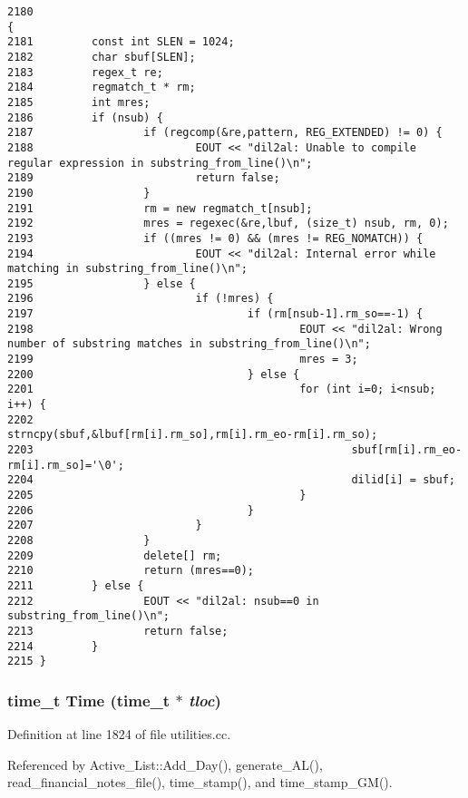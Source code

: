 \footnotesize\begin{verbatim}2180                                                                                             {
2181         const int SLEN = 1024;
2182         char sbuf[SLEN];
2183         regex_t re;
2184         regmatch_t * rm;
2185         int mres;
2186         if (nsub) {
2187                 if (regcomp(&re,pattern, REG_EXTENDED) != 0) {
2188                         EOUT << "dil2al: Unable to compile regular expression in substring_from_line()\n";
2189                         return false;
2190                 }
2191                 rm = new regmatch_t[nsub];
2192                 mres = regexec(&re,lbuf, (size_t) nsub, rm, 0);
2193                 if ((mres != 0) && (mres != REG_NOMATCH)) {
2194                         EOUT << "dil2al: Internal error while matching in substring_from_line()\n";
2195                 } else {
2196                         if (!mres) {
2197                                 if (rm[nsub-1].rm_so==-1) {
2198                                         EOUT << "dil2al: Wrong number of substring matches in substring_from_line()\n";
2199                                         mres = 3;
2200                                 } else {
2201                                         for (int i=0; i<nsub; i++) {
2202                                                 strncpy(sbuf,&lbuf[rm[i].rm_so],rm[i].rm_eo-rm[i].rm_so);
2203                                                 sbuf[rm[i].rm_eo-rm[i].rm_so]='\0';
2204                                                 dilid[i] = sbuf;
2205                                         }
2206                                 }
2207                         }
2208                 }
2209                 delete[] rm;
2210                 return (mres==0);
2211         } else {
2212                 EOUT << "dil2al: nsub==0 in substring_from_line()\n";
2213                 return false;
2214         }
2215 }
\end{verbatim}\normalsize 
{}
\subsubsection{\setlength{\rightskip}{0pt plus 5cm}time\_\-t Time (time\_\-t $\ast$ {\em tloc})}\label{utilities_8cc_a19}




Definition at line 1824 of file utilities.cc.

Referenced by Active\_\-List::Add\_\-Day(), generate\_\-AL(), read\_\-financial\_\-notes\_\-file(), time\_\-stamp(), and time\_\-stamp\_\-GM().



